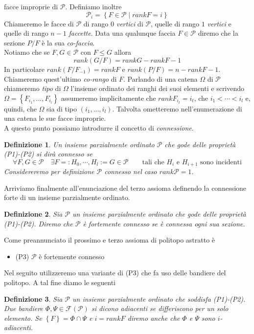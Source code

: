 \documentclass[12pt,a4paper,twoside]{book}
\newcommand{\p}{\mathcal{P}}
\newtheorem{defin}{Definizione}
\begin{document}
facce improprie di $\p$.
Definiamo inoltre
\begin{equation*}
\p_i=\left\{F\in\p\mid rankF=i\right\}
\end{equation*}
Chiameremo le facce di $\p$ di rango $0$ \emph{vertici} di $\p$, quelle di rango $1$ \emph{vertici} e quelle di rango $n-1$ \emph{faccette}. Data 
una qualunque faccia $F\in\p$ diremo che la sezione $P/F$ \`e la sua \emph{co-faccia}.\\
Notiamo che se $F,G\in\p$ con $F\leq G$ allora
\begin{equation*}
rank(G/F)=rankG-rankF-1
\end{equation*}
In particolare $rank(F/F_{-1})=rankF$ e $rank(P/F)=n-rankF-1$. Chiameremo quest'ultimo \emph{co-rango} di $F$.
Parlando di una catena $\Omega$ di $\p$ chiameremo \emph{tipo} di $\Omega$ l'insieme ordinato dei ranghi dei suoi elementi e scrivendo 
$\Omega=\left\{F_{i_1},\dots,F_{i_l}\right\}$ assumeremo implicitamente che $rankF_{i_t}=i_t$, che $i_1<\cdots<i_l$ e, quindi,
che $\Omega$ sia di tipo $(i_1,\dots,i_l)$.
Talvolta ometteremo nell'enumerazione di una catena le sue facce improprie.\\
A questo punto possiamo introdurre il concetto di \emph{connessione}.
\begin{defin}
Un insieme parzialmente ordinato $\p$ che gode delle propriet\`a (P1)-(P2) si dir\`a \emph{connesso} se
\begin{equation*}
\forall F,G\in\p\quad\exists F=:H_0,\cdots,H_l:=G\in\p\qquad \text{tali che }H_i\text{ e }H_{i+1}\text{ sono incidenti}
\end{equation*}
Considereremo per definizione $\p$ connesso nel caso $rank\p=1$.
\end{defin}
Arriviamo finalmente all'enunciazione del terzo assioma definendo la connessione forte di un insieme parzialmente ordinato.
\begin{defin}
Sia $\p$ un insieme parzialmente ordinato che gode delle propriet\`a (P1)-(P2). Diremo che $\p$ \`e \emph{fortemente connesso} se
\`e connessa ogni sua sezione.
\end{defin}
Come preannunciato il prossimo e terzo assioma di politopo astratto \`e
\begin{itemize}
\item (P3) $\p$ \`e fortemente connesso
\end{itemize}
Nel seguito utilizzeremo una variante di (P3) che fa uso delle bandiere del politopo. A tal fine diamo le seguenti
\begin{defin}
Sia $\p$ un insieme parzialmente ordinato che soddisfa (P1)-(P2). Due bandiere $\Phi,\Psi\in\mathcal{F}(\p)$ si dicono \emph{adiacenti}
se differiscono per un solo elemento. Se $\left\{F\right\}=\Phi\cap\Psi$ e $i=rankF$ diremo anche che $\Phi$ e $\Psi$ sono $i$-adiacenti.\\
\end{defin}
\end{document}
